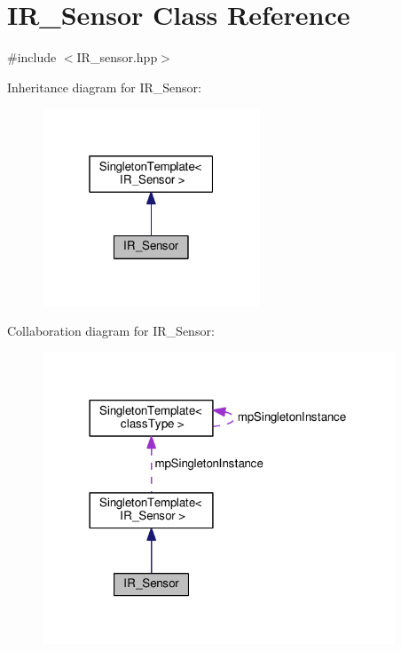 \hypertarget{classIR__Sensor}{}\section{I\+R\+\_\+\+Sensor Class Reference}
\label{classIR__Sensor}


{\ttfamily \#include $<$I\+R\+\_\+sensor.\+hpp$>$}



Inheritance diagram for I\+R\+\_\+\+Sensor\+:\nopagebreak
\begin{figure}[H]
\begin{center}
\leavevmode
\includegraphics[width=184pt]{d5/d2d/classIR__Sensor__inherit__graph}
\end{center}
\end{figure}


Collaboration diagram for I\+R\+\_\+\+Sensor\+:\nopagebreak
\begin{figure}[H]
\begin{center}
\leavevmode
\includegraphics[width=297pt]{d7/d76/classIR__Sensor__coll__graph}
\end{center}
\end{figure}
